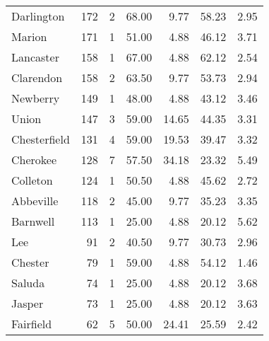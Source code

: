 \begin{tabular}{lrrrrrr}
Darlington   &   172 &      2 &  68.00 &       9.77 &     58.23 &    2.95 \\
Marion       &   171 &      1 &  51.00 &       4.88 &     46.12 &    3.71 \\
Lancaster    &   158 &      1 &  67.00 &       4.88 &     62.12 &    2.54 \\
Clarendon    &   158 &      2 &  63.50 &       9.77 &     53.73 &    2.94 \\
Newberry     &   149 &      1 &  48.00 &       4.88 &     43.12 &    3.46 \\
Union        &   147 &      3 &  59.00 &      14.65 &     44.35 &    3.31 \\
Chesterfield &   131 &      4 &  59.00 &      19.53 &     39.47 &    3.32 \\
Cherokee     &   128 &      7 &  57.50 &      34.18 &     23.32 &    5.49 \\
Colleton     &   124 &      1 &  50.50 &       4.88 &     45.62 &    2.72 \\
Abbeville    &   118 &      2 &  45.00 &       9.77 &     35.23 &    3.35 \\
Barnwell     &   113 &      1 &  25.00 &       4.88 &     20.12 &    5.62 \\
Lee          &    91 &      2 &  40.50 &       9.77 &     30.73 &    2.96 \\
Chester      &    79 &      1 &  59.00 &       4.88 &     54.12 &    1.46 \\
Saluda       &    74 &      1 &  25.00 &       4.88 &     20.12 &    3.68 \\
Jasper       &    73 &      1 &  25.00 &       4.88 &     20.12 &    3.63 \\
Fairfield    &    62 &      5 &  50.00 &      24.41 &     25.59 &    2.42 \\
\bottomrule
\end{tabular}
